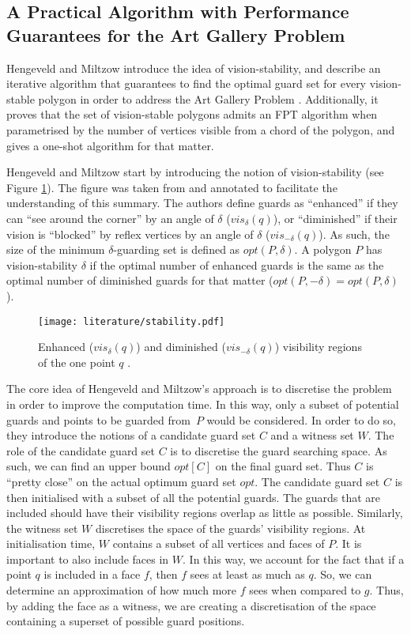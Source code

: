 \subsection[An Algorithm with Performance Guarantees]{A Practical Algorithm with Performance Guarantees for the Art Gallery Problem}
Hengeveld and Miltzow \cite{DBLP:journals/corr/abs-2007-06920} introduce the idea of vision-stability, and describe an iterative algorithm that guarantees to find the optimal guard set for every vision-stable polygon in order to address the Art Gallery Problem \cite{o1987art}. Additionally, it proves that the set of vision-stable polygons admits an FPT algorithm when parametrised by the number of vertices visible from a chord of the polygon, and gives a one-shot algorithm for that matter.

Hengeveld and Miltzow \cite{DBLP:journals/corr/abs-2007-06920} start by introducing the notion of vision-stability (see Figure \ref{fig:vis}). The figure was taken from \cite{DBLP:journals/corr/abs-2007-06920} and annotated to facilitate the understanding of this summary. The authors define guards as ``enhanced'' if they can ``see around the corner'' by an angle of $\delta$ ($vis_\delta(q)$), or ``diminished'' if their vision is ``blocked'' by reflex vertices by an angle of $\delta$ ($vis_{-\delta}(q)$). As such, the size of the minimum $\delta$-guarding set is defined as $opt(P, \delta)$. A polygon $P$ has vision-stability $\delta$ if the optimal number of enhanced guards is the same as the optimal number of diminished guards for that matter ($opt(P, -\delta) = opt(P, \delta)$). 

\begin{figure}[h!]
    \centering
    \texttt{[image: literature/stability.pdf]}
    \caption{Enhanced ($vis_\delta(q)$) and diminished ($vis_{-\delta}(q)$) visibility regions of the one point $q$ \cite{DBLP:journals/corr/abs-2007-06920}.}
    \label{fig:vis}
\end{figure}

The core idea of Hengeveld and Miltzow's approach is to discretise the problem in order to improve the computation time. In this way, only a subset of potential guards and points to be guarded from~$P$ would be considered. In order to do so, they introduce the notions of a candidate guard set $C$ and a witness set $W$. The role of the candidate guard set $C$ is to discretise the guard searching space. As such, we can find an upper bound $opt[C]$ on the final guard set. Thus $C$ is ``pretty close'' on the actual optimum guard set $opt$. The candidate guard set $C$ is then initialised with a subset of all the potential guards. The guards that are included should have their visibility regions overlap as little as possible. Similarly, the witness set $W$ discretises the space of the guards' visibility regions. At initialisation time, $W$ contains a subset of all vertices and faces of $P$. It is important to also include faces in $W$. In this way, we account for the fact that if a point $q$ is included in a face $f$, then $f$ sees at least as much as $q$. So, we can determine an approximation of how much more $f$ sees when compared to $g$. Thus, by adding the face as a witness, we are creating a discretisation of the space containing a superset of possible guard positions.

